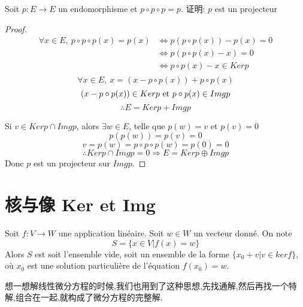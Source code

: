 \documentclass{book}
\begin{document}
\begin{example}
\end{example}
Soit $p: E \rightarrow E$ un endomorphisme et $p \circ p \circ p = p$.
证明: $p$ est un projecteur
\begin{proof}
$$
\begin{aligned}
\forall x \in E,~ p \circ p \circ p(x) = p(x)
& \Leftrightarrow p(p \circ p(x)) - p(x) = 0 \\
& \Leftrightarrow p(p \circ p(x) - x) = 0 \\
& \Leftrightarrow p \circ p(x) - x \in Ker p \\
\end{aligned}
$$
$$\forall x \in E,~ x = (x - p \circ p(x)) + p \circ p(x)$$
$$(x - p \circ p(x)) \in Ker p \textrm{\ et } p \circ p(x) \in Img p$$
$$\therefore E = Ker p + Img p$$

Si $v \in Ker p \cap Img p$, alors $\exists w \in E$, telle que $p(w) = v$ et $p(v) = 0$
$$p(p(w)) = p(v) = 0$$
$$v = p(w) = p \circ p \circ p(w) = p(0) = 0$$
$$\therefore Ker p \cap Img p = {0} \Rightarrow E = Ker p \oplus Img p$$
Donc $p$ est un projecteur sur $Img p$.
\end{proof}

\section{核与像 Ker et Img}
\begin{theorem}
Soit $f:V \rightarrow W$ une application lin\'eaire. Soit $w \in W$ un vecteur donn\'e. On note
$$ S=\{x \in V|f(x)=w\} $$
Alors $S$ est soit l'ensemble vide, soit un ensemble de la forme $\{x_0+v|v \in ker f\}$, o\`u $x_0$ est une solution particuli\`ere de l'\'equation $f(x_0)=w$.
\end{theorem}
\begin{note}
想一想解线性微分方程的时候,我们也用到了这种思想,先找通解,然后再找一个特解,组合在一起,就构成了微分方程的完整解.
\end{note}
\end{document}
